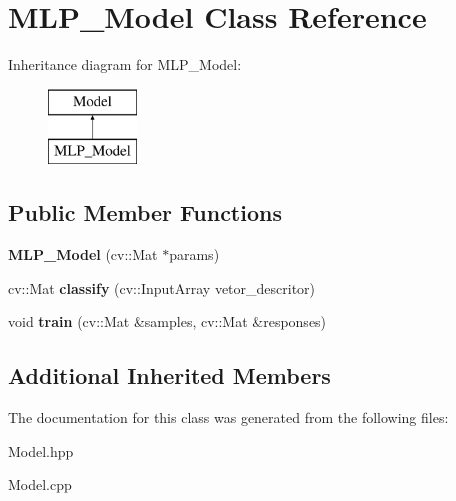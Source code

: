 \hypertarget{class_m_l_p___model}{\section{M\+L\+P\+\_\+\+Model Class Reference}
\label{class_m_l_p___model}
}
Inheritance diagram for M\+L\+P\+\_\+\+Model\+:\begin{figure}[H]
\begin{center}
\leavevmode
\includegraphics[height=2.000000cm]{class_m_l_p___model}
\end{center}
\end{figure}
\subsection*{Public Member Functions}
\begin{DoxyCompactItemize}
\item 
\hypertarget{class_m_l_p___model_aad376359624227d53d9a235b4e3d1521}{{\bfseries M\+L\+P\+\_\+\+Model} (cv\+::\+Mat $\ast$params)}\label{class_m_l_p___model_aad376359624227d53d9a235b4e3d1521}

\item 
\hypertarget{class_m_l_p___model_a2c6a9b507afa9a8988f2f478210ff47a}{cv\+::\+Mat {\bfseries classify} (cv\+::\+Input\+Array vetor\+\_\+descritor)}\label{class_m_l_p___model_a2c6a9b507afa9a8988f2f478210ff47a}

\item 
\hypertarget{class_m_l_p___model_ae9223d97c1fc30970eb0addfec150a04}{void {\bfseries train} (cv\+::\+Mat \&samples, cv\+::\+Mat \&responses)}\label{class_m_l_p___model_ae9223d97c1fc30970eb0addfec150a04}

\end{DoxyCompactItemize}
\subsection*{Additional Inherited Members}


The documentation for this class was generated from the following files\+:\begin{DoxyCompactItemize}
\item 
Model.\+hpp\item 
Model.\+cpp\end{DoxyCompactItemize}
